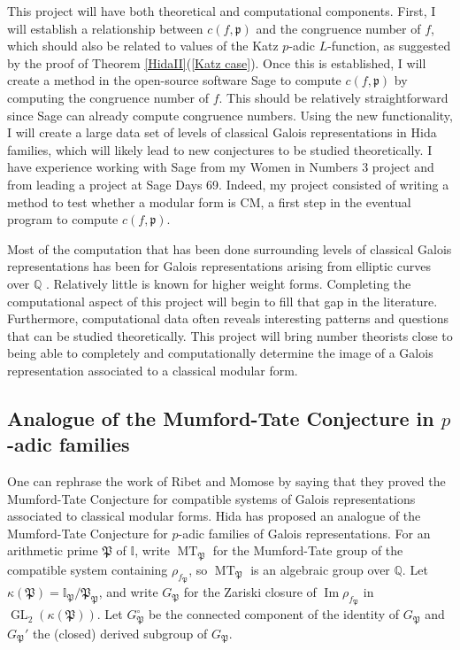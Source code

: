 \documentclass[11pt]{amsart}
\theoremstyle{definition}
\theoremstyle{remark}
\DeclareMathOperator{\MT}{MT}
\def\I{\mathbb{I}}
\def\p{\mathfrak{p}}
\def\Pp{\mathfrak{P}}
\def\Q{\mathbb{Q}}
\DeclareMathOperator{\GL}{GL}
\DeclareMathOperator{\im}{Im}
\begin{document}
This project will have both theoretical and computational components.  First, I will establish a relationship between $c(f, \p)$ and the congruence number of $f$, which should also be related to values of the Katz $p$-adic $L$-function, as suggested by the proof of Theorem \ref{HidaII}(\ref{Katz case}).  Once this is established, I will create a method in the open-source software Sage \cite{SAGE} to compute $c(f, \p)$ by computing the congruence number of $f$.  This should be relatively straightforward since Sage can already compute congruence numbers.  Using the new functionality, I will create a large  data set of levels of classical Galois representations in Hida families, which will likely lead to new conjectures to be studied theoretically.  I have experience working with Sage from my Women in Numbers 3 project \cite{BCLMN15} and from leading a project at Sage Days 69.  Indeed, my project consisted of writing a method to test whether a modular form is CM, a first step in the eventual program to compute $c(f, \p)$.

Most of the computation that has been done surrounding levels of classical Galois representations has been for Galois representations arising from elliptic curves over $\Q$ \cite{RouseZureickBrown15, Sutherland15, Zywina15b}.  Relatively little is known for higher weight forms.  Completing the computational aspect of this project will begin to fill that gap in the literature.  Furthermore, computational data often reveals interesting patterns and questions that can be studied theoretically.  This project will bring number theorists close to being able to completely and computationally determine the image of a Galois representation associated to a classical modular form.

\subsection*{Analogue of the Mumford-Tate Conjecture in $p$-adic families}
One can rephrase the work of Ribet and Momose by saying that they proved the Mumford-Tate Conjecture for compatible systems of Galois representations associated to classical modular forms.  Hida has proposed an analogue of the Mumford-Tate Conjecture for $p$-adic families of Galois representations.  For an arithmetic prime $\Pp$ of $\I$, write $\MT_\Pp$ for the Mumford-Tate group of the compatible system containing $\rho_{f_\Pp}$, so $\MT_\Pp$ is an algebraic group over $\Q$.  Let $\kappa(\Pp) = \I_\Pp/\Pp_\Pp$, and write $G_\Pp$ for the Zariski closure of $\im \rho_{f_\Pp}$ in $\GL_2(\kappa(\Pp))$.  Let $G_\Pp^\circ$ be the connected component of the identity of $G_\Pp$ and $G_\Pp'$ the (closed) derived subgroup of $G_\Pp$.
\end{document}
